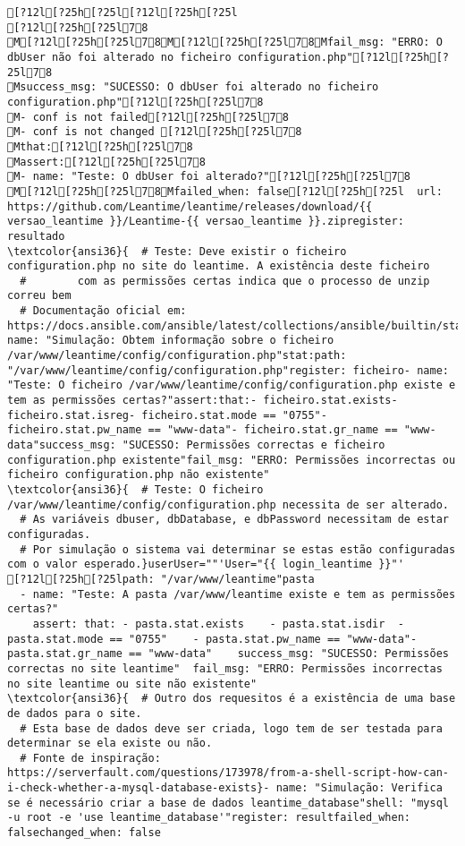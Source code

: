 \documentclass{scrartcl}
\begin{document}
\begin{Verbatim}
[?12l[?25h[?25l[?12l[?25h[?25l
[?12l[?25h[?25l78
M[?12l[?25h[?25l78M[?12l[?25h[?25l78Mfail_msg: "ERRO: O dbUser não foi alterado no ficheiro configuration.php"[?12l[?25h[?25l78
Msuccess_msg: "SUCESSO: O dbUser foi alterado no ficheiro configuration.php"[?12l[?25h[?25l78
M- conf is not failed[?12l[?25h[?25l78
M- conf is not changed [?12l[?25h[?25l78
Mthat:[?12l[?25h[?25l78
Massert:[?12l[?25h[?25l78
M- name: "Teste: O dbUser foi alterado?"[?12l[?25h[?25l78
M[?12l[?25h[?25l78Mfailed_when: false[?12l[?25h[?25l  url: https://github.com/Leantime/leantime/releases/download/{{ versao_leantime }}/Leantime-{{ versao_leantime }}.zipregister: resultado
\textcolor{ansi36}{  # Teste: Deve existir o ficheiro configuration.php no site do leantime. A existência deste ficheiro
  #        com as permissões certas indica que o processo de unzip correu bem
  # Documentação oficial em: https://docs.ansible.com/ansible/latest/collections/ansible/builtin/stat_module.html}- name: "Simulação: Obtem informação sobre o ficheiro /var/www/leantime/config/configuration.php"stat:path: "/var/www/leantime/config/configuration.php"register: ficheiro- name: "Teste: O ficheiro /var/www/leantime/config/configuration.php existe e tem as permissões certas?"assert:that:- ficheiro.stat.exists- ficheiro.stat.isreg- ficheiro.stat.mode == "0755"- ficheiro.stat.pw_name == "www-data"- ficheiro.stat.gr_name == "www-data"success_msg: "SUCESSO: Permissões correctas e ficheiro configuration.php existente"fail_msg: "ERRO: Permissões incorrectas ou ficheiro configuration.php não existente"
\textcolor{ansi36}{  # Teste: O ficheiro /var/www/leantime/config/configuration.php necessita de ser alterado.
  # As variáveis dbuser, dbDatabase, e dbPassword necessitam de estar configuradas.
  # Por simulação o sistema vai determinar se estas estão configuradas com o valor esperado.}userUser=""'User="{{ login_leantime }}"'
[?12l[?25h[?25lpath: "/var/www/leantime"pasta
  - name: "Teste: A pasta /var/www/leantime existe e tem as permissões certas?"
    assert: that: - pasta.stat.exists    - pasta.stat.isdir  - pasta.stat.mode == "0755"    - pasta.stat.pw_name == "www-data"- pasta.stat.gr_name == "www-data"    success_msg: "SUCESSO: Permissões correctas no site leantime"  fail_msg: "ERRO: Permissões incorrectas no site leantime ou site não existente"
\textcolor{ansi36}{  # Outro dos requesitos é a existência de uma base de dados para o site.
  # Esta base de dados deve ser criada, logo tem de ser testada para determinar se ela existe ou não.
  # Fonte de inspiração: https://serverfault.com/questions/173978/from-a-shell-script-how-can-i-check-whether-a-mysql-database-exists}- name: "Simulação: Verifica se é necessário criar a base de dados leantime_database"shell: "mysql -u root -e 'use leantime_database'"register: resultfailed_when: falsechanged_when: false

\end{Verbatim}
\end{document}

